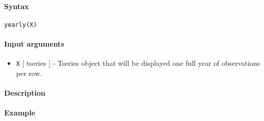 


	\paragraph{Syntax}

\begin{verbatim}
yearly(X)
\end{verbatim}

\paragraph{Input arguments}

\begin{itemize}
\itemsep1pt\parskip0pt
\item
  \texttt{X} {[} tseries {]} - Tseries object that will be displayed one
  full year of observations per row.
\end{itemize}

\paragraph{Description}

\paragraph{Example}


